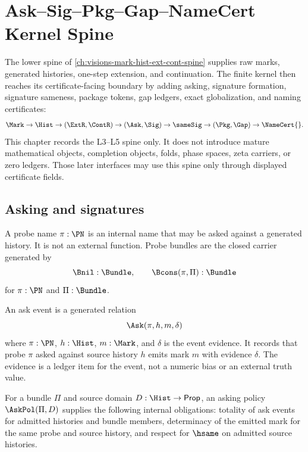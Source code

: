 \chapter{Ask--Sig--Pkg--Gap--NameCert Kernel Spine}
\label{ch:visions-ask-sig-pkg-gap-namecert-spine}

The lower spine of \autoref{ch:visions-mark-hist-ext-cont-spine} supplies
raw marks, generated histories, one-step extension, and continuation.  The
finite kernel then reaches its certificate-facing boundary by adding asking,
signature formation, signature sameness, package tokens, gap ledgers, exact
globalization, and naming certificates:
$$
\Mark
\to
\Hist
\to
(\ExtR,\ContR)
\to
(\Ask,\Sig)
\to
\sameSig
\to
(\Pkg,\Gap)
\to
\NameCert{}.
$$
This chapter records the L3--L5 spine only.  It does not introduce mature
mathematical objects, completion objects, folds, phase spaces, zeta carriers,
or zero ledgers.  Those later interfaces may use this spine only through
displayed certificate fields.

\section{Asking and signatures}
\label{sec:ask-sig-spine-asking-signatures}

\begin{definition}
\label{def:ask-sig-spine-probe-bundles}
A probe name $\pi:\PN$ is an internal name that may be asked against a
generated history.  It is not an external function.  Probe bundles are the
closed carrier generated by
$$
\Bnil:\Bundle,
\qquad
\Bcons(\pi,\Pi):\Bundle
$$
for $\pi:\PN$ and $\Pi:\Bundle$.
\end{definition}

\begin{definition}
\label{def:ask-sig-spine-ask-event}
An ask event is a generated relation
$$
\Ask(\pi,h,m,\delta)
$$
where $\pi:\PN$, $h:\Hist$, $m:\Mark$, and $\delta$ is the event evidence.
It records that probe $\pi$ asked against source history $h$ emits mark $m$
with evidence $\delta$.  The evidence is a ledger item for the event, not a
numeric bias or an external truth value.
\end{definition}

\begin{definition}
\label{def:ask-sig-spine-ask-policy}
For a bundle $\Pi$ and source domain $D:\Hist\to\mathsf{Prop}$, an asking
policy $\AskPol(\Pi,D)$ supplies the following internal obligations:
totality of ask events for admitted histories and bundle members,
determinacy of the emitted mark for the same probe and source history, and
respect for $\hsame$ on admitted source histories.
\end{definition}

